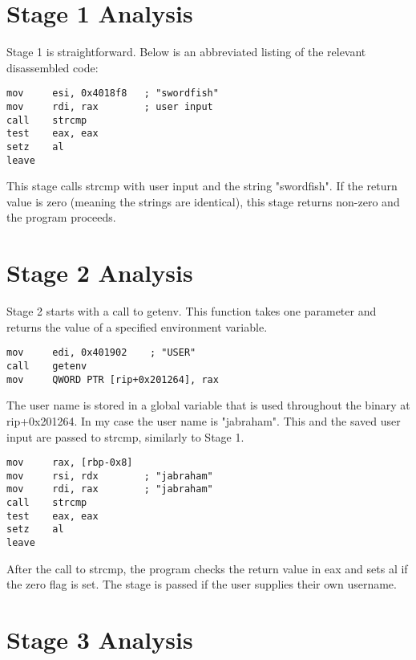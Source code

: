 \documentclass{article}
\begin{document}
\newpage
\section{Stage 1 Analysis}
\begin{flushleft}
\vspace{.5pc}
\end{flushleft}
\par
Stage 1 is straightforward.  Below is an abbreviated listing of the relevant
disassembled code:
\begin{lstlisting}
mov     esi, 0x4018f8   ; "swordfish"
mov     rdi, rax        ; user input
call    strcmp
test    eax, eax
setz    al
leave
\end{lstlisting}
\par
This stage calls strcmp with user input and the string "swordfish".  If the 
return value is zero (meaning the strings are identical), this stage returns 
non-zero and the program proceeds.

\newpage
\section{Stage 2 Analysis}
\begin{flushleft}
\vspace{.5pc}
\end{flushleft}
\par
Stage 2 starts with a call to getenv.  This function takes one parameter and 
returns the value of a specified environment variable.
\begin{lstlisting}
mov     edi, 0x401902    ; "USER"
call    getenv
mov     QWORD PTR [rip+0x201264], rax
\end{lstlisting}
\par
The user name is stored in a global variable that is used throughout the 
binary at rip+0x201264.  In my case the user name is "jabraham".  This and the 
saved user input are passed to strcmp, similarly to Stage 1.
\begin{lstlisting}
mov     rax, [rbp-0x8]
mov     rsi, rdx        ; "jabraham"
mov     rdi, rax        ; "jabraham"
call    strcmp
test    eax, eax
setz    al
leave
\end{lstlisting}
\par
After the call to strcmp, the program checks the return value in eax and sets 
al if the zero flag is set.  The stage is passed if the user supplies their 
own username.

\newpage
\section{Stage 3 Analysis}
\begin{flushleft}
\vspace{.5pc}
\end{flushleft}
\end{document}
